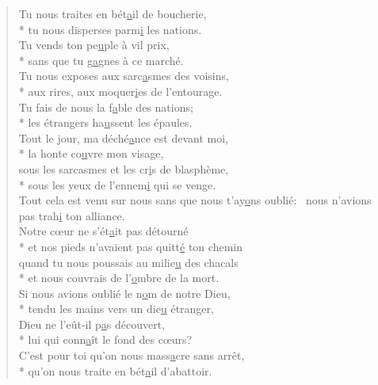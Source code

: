 \begin{verse}
Tu nous traites en bét\underline{a}il de boucherie, \\*
tu nous disperses parm\underline{i} les nations. \\
Tu vends ton pe\underline{u}ple à vil prix, \\*
sans que tu g\underline{a}gnes à ce marché. \\

Tu nous exposes aux sarc\underline{a}smes des voisins, \\*
aux rires, aux moquer\underline{i}es de l’entourage. \\
Tu fais de nous la f\underline{a}ble des nations; \\*
les étrangers ha\underline{u}ssent les épaules. \\

Tout le jour, ma déché\underline{a}nce est devant moi, \\*
la honte co\underline{u}vre mon visage, \\
sous les sarcasmes et les cr\underline{i}s de blasphème, \\*
sous les yeux de l’ennem\underline{i} qui se venge. \\

Tout cela est venu sur nous sans que nous t’ay\underline{o}ns oublié:~\psalmstar
nous n’avions pas trah\underline{i} ton alliance. \\

Notre cœur ne s’ét\underline{a}it pas détourné \\*
et nos pieds n’avaient pas quitt\underline{é} ton chemin \\
quand tu nous poussais au milie\underline{u} des chacals \\*
et nous couvrais de l’\underline{o}mbre de la mort. \\

Si nous avions oublié le n\underline{o}m de notre Dieu, \\*
tendu les mains vers un die\underline{u} étranger, \\
Dieu ne l’eût-il p\underline{a}s découvert, \\*
lui qui conn\underline{a}ît le fond des cœurs? \\
C’est pour toi qu’on nous mass\underline{a}cre sans arrêt, \\*
qu’on nous traite en bét\underline{a}il d’abattoir. \\


\end{verse}
